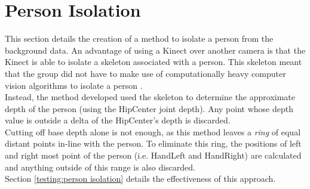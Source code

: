 \section{Person Isolation}
\label{design:person isolation}
This section details the creation of a method to isolate a person from the background data.
An advantage of using a Kinect over another camera is that the Kinect is able to isolate a skeleton associated with a person.
This skeleton meant that the group did not have to make use of computationally heavy computer vision algorithms to isolate a person .\\

Instead, the method developed used the skeleton to determine the approximate depth of the person (using the HipCenter joint depth). 
Any point whose depth value is outside a delta of the HipCenter's depth is discarded.\\ 

Cutting off base depth alone is not enough, as this method leaves a \textit{ring} of equal distant points in-line with the person. 
To eliminate this ring, the positions of left and right most point of the person (i.e. HandLeft and HandRight) are calculated and anything outside of this range is also discarded. \\

Section \ref{testing:person isolation} details the effectiveness of this approach.